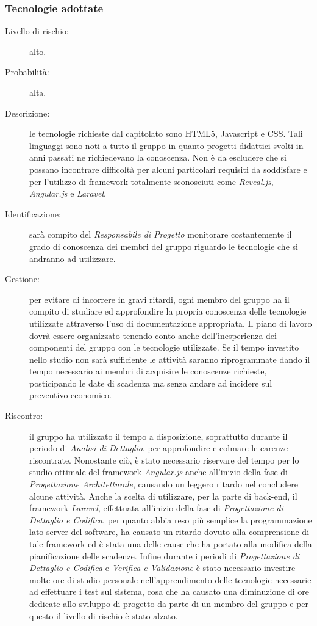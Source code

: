 \subsubsection{Tecnologie adottate}
\begin{description}
	\item[Livello di rischio:] alto.
	\item[Probabilità:] alta.
	\item[Descrizione:] le tecnologie richieste dal capitolato sono \gls{HTML5}, \gls{Javascript} e \gls{CSS}. Tali linguaggi sono noti a tutto il gruppo in quanto progetti didattici svolti in anni passati ne richiedevano la conoscenza. Non è da escludere che si possano incontrare difficoltà per alcuni particolari requisiti da soddisfare e per l'utilizzo di \gls{framework} totalmente sconosciuti come \textit{\gls{Reveal.js}}, \textit{\gls{Angular.js}} e \textit{\gls{Laravel}}.
	\item[Identificazione:] sarà compito del \textit{Responsabile di Progetto} monitorare costantemente il grado di conoscenza dei membri del gruppo riguardo le tecnologie che si andranno ad utilizzare.
	\item[Gestione:] per evitare di incorrere in gravi ritardi, ogni membro del gruppo ha il compito di studiare ed approfondire la propria conoscenza delle tecnologie utilizzate attraverso l'uso di documentazione appropriata. Il piano di lavoro dovrà essere organizzato tenendo conto anche dell'inesperienza dei componenti del gruppo con le tecnologie utilizzate. Se il tempo investito nello studio non sarà sufficiente le attività saranno riprogrammate dando il tempo necessario ai membri di acquisire le conoscenze richieste, posticipando le date di scadenza ma senza andare ad incidere sul preventivo economico.
	\item[Riscontro:] il gruppo ha utilizzato il tempo a disposizione, soprattutto durante il periodo di \textit{Analisi di Dettaglio}, per approfondire e colmare le carenze riscontrate. Nonostante ciò, è stato necessario riservare del tempo per lo studio ottimale del \gls{framework} \textit{\gls{Angular.js}} anche all'inizio della fase di \textit{Progettazione Architetturale}, causando un leggero ritardo nel concludere alcune attività. Anche la scelta di utilizzare, per la parte di \gls{back-end}, il \gls{framework} \textit{\gls{Laravel}}, effettuata all'inizio della fase di \textit{Progettazione di Dettaglio e Codifica}, per quanto abbia reso più semplice la programmazione lato server del software, ha causato un ritardo dovuto alla comprensione di tale \gls{framework} ed è stata una delle cause che ha portato alla modifica della pianificazione delle scadenze. Infine durante i periodi di \textit{Progettazione di Dettaglio e Codifica} e \textit{Verifica e Validazione} è stato necessario investire molte ore di studio personale nell'apprendimento delle tecnologie necessarie ad effettuare i test sul sistema, cosa che ha causato una diminuzione di ore dedicate allo sviluppo di progetto da parte di un membro del gruppo e per questo il livello di rischio è stato alzato.
\end{description}
